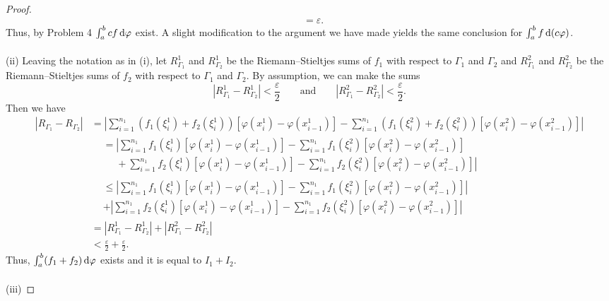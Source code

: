 \begin{proof}
\begin{align*}
    &=\varepsilon.
  \end{align*}
  Thus, by Problem 4 $\int_a^b cf\mathop{}\!\mathrm{d}\varphi$ exist. A slight modification
  to the argument we have made yields the same conclusion for
  $\int_a^b f\mathop{}\!\mathrm{d}(c\varphi)$.
  \\\\
  (ii) Leaving the notation as in (i), let $R_{\Gamma_1}^1$ and
  $R_{\Gamma_2}^1$ be the Riemann--Stieltjes sums of $f_1$ with respect to
  $\Gamma_1$ and $\Gamma_2$ and $R_{\Gamma_1}^2$ and $R_{\Gamma_2}^2$ be
  the Riemann--Stieltjes sums of $f_2$ with respect to $\Gamma_1$ and
  $\Gamma_2$. By assumption, we can make the sums
  \[
    |R_{\Gamma_1}^1-R_{\Gamma_2}^1|<\frac{\varepsilon}{2}
    \qquad\text{and}\qquad
    |R_{\Gamma_1}^2-R_{\Gamma_2}^2|<\frac{\varepsilon}{2}.
  \]
  Then we have
  \begin{align*}
    |R_{\Gamma_1}-R_{\Gamma_2}|
    &=\left|
      \sum_{i=1}^{n_1}(f_1(\xi_i^1)+f_2(\xi_i^1))
      \left[\varphi(x_i^1)-\varphi(x_{i-1}^1)\right]
      -\sum_{i=1}^{n_1}(f_1(\xi_i^2)+f_2(\xi_i^2))
      \left[\varphi(x_i^2)-\varphi(x_{i-1}^2)\right]
      \right|\\
    &\begin{aligned}
      &=\left|\sum_{i=1}^{n_1}f_1(\xi_i^1)
        \left[\varphi(x_i^1)-\varphi(x_{i-1}^1)\right]
        -\sum_{i=1}^{n_1}f_1(\xi_i^2)
        \left[\varphi(x_i^2)-\varphi(x_{i-1}^2)
        \right]\right.\\
      &\phantom{{}={}}+\left. \sum_{i=1}^{n_1}f_2(\xi_i^1)
        \left[\varphi(x_i^1)-\varphi(x_{i-1}^1)\right]
        -\sum_{i=1}^{n_1}f_2(\xi_i^2)
        \left[\varphi(x_i^2)-\varphi(x_{i-1}^2) \right] \right|
    \end{aligned}\\
    &\begin{aligned}
      &\leq\left|\sum_{i=1}^{n_1}f_1(\xi_i^1)
        \left[\varphi(x_i^1)-\varphi(x_{i-1}^1)\right]
        -\sum_{i=1}^{n_1}f_1(\xi_i^2)
        \left[\varphi(x_i^2)-\varphi(x_{i-1}^2)
        \right]\right|\\
      &+\left|\sum_{i=1}^{n_1}f_2(\xi_i^1)
        \left[\varphi(x_i^1)-\varphi(x_{i-1}^1)\right]
        -\sum_{i=1}^{n_1}f_2(\xi_i^2)
        \left[\varphi(x_i^2)-\varphi(x_{i-1}^2) \right] \right|
    \end{aligned}\\
    &=|R_{\Gamma_1}^1-R_{\Gamma_2}^1|+|R_{\Gamma_1}^2-R_{\Gamma_2}^2|\\
    &<\frac{\varepsilon}{2}+\frac{\varepsilon}{2}.
  \end{align*}
  Thus, $\int_a^b (f_1+f_2)\mathop{}\!\mathrm{d}\varphi$ exists and it is equal to
  $I_1+I_2$.
  \\\\
  (iii)
\end{proof}

